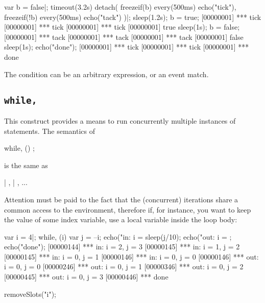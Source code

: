 \begin{urbiscript}
var b = false|;
timeout(3.2s) detach({
  freezeif(b) every(500ms) echo("tick"),
  freezeif(!b) every(500ms) echo("tack")
  })|;
sleep(1.2s); b = true;
[00000001] *** tick
[00000001] *** tick
[00000001] *** tick
[00000001] true
sleep(1s); b = false;
[00000001] *** tack
[00000001] *** tack
[00000001] *** tack
[00000001] false
sleep(1s); echo("done");
[00000001] *** tick
[00000001] *** tick
[00000001] *** done
\end{urbiscript}

The condition can be an arbitrary expression, or an event match.

\subsection{\lstinline{while,}}
\label{sec:lang:while:comma}
\experimentalremoved{}

This construct provides a means to run concurrently multiple instances
of statements.  The semantics of

\begin{urbiunchecked}
while, ()
  ;
\end{urbiunchecked}

\noindent
is the same as

\begin{urbiunchecked}
 |  ,  |  , ...
\end{urbiunchecked}

Attention must be paid to the fact that the (concurrent) iterations
share a common access to the environment, therefore if, for instance,
you want to keep the value of some index variable, use a local
variable inside the loop body:

\begin{urbiscript}[firstnumber=1]
var i = 4|;
while, (i)
{
  var j = --i;
  echo("in: i = %
  sleep(j/10);
  echo("out: i = %
};
echo("done");
[00000144] *** in: i = 2, j = 3
[00000145] *** in: i = 1, j = 2
[00000145] *** in: i = 0, j = 1
[00000146] *** in: i = 0, j = 0
[00000146] *** out: i = 0, j = 0
[00000246] *** out: i = 0, j = 1
[00000346] *** out: i = 0, j = 2
[00000445] *** out: i = 0, j = 3
[00000446] *** done
\end{urbiscript}
\begin{urbicomment}
removeSlots("i");
\end{urbicomment}

